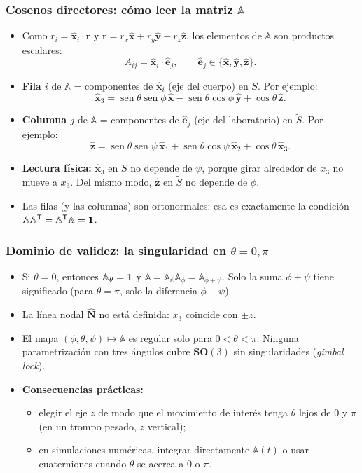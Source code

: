 \documentclass[spanish]{beamer}
\providecommand{\sen}{\operatorname{sen}}       %
\newcommand{\vect}[1]{\mathbf{#1}}              %
\newcommand{\uv}[1]{\hat{\mathbf{#1}}}          %
\newcommand{\Rot}{\mathbb{A}}                   %
\newcommand{\Slab}{S}                           %
\newcommand{\Scue}{\tilde{S}}                   %
\newcommand{\tr}{\mathsf{T}}                    %
\begin{document}
\begin{frame}
  \frametitle{Cosenos directores: cómo leer la matriz $\Rot$}
  \begin{itemize}
    \item<1-> Como $r_i=\uv{x}_i\cdot\vect{r}$ y $\vect{r}=r_x\uv{x}+r_y\uv{y}+r_z\uv{z}$,
          los elementos de $\Rot$ son productos escalares:
          \[
            A_{ij}=\uv{x}_i\cdot\uv{e}_j,\qquad \uv{e}_j\in\{\uv{x},\uv{y},\uv{z}\}.
          \]
    \item<2-> \textbf{Fila $i$} de $\Rot$ = componentes de $\uv{x}_i$ (eje del cuerpo)
          en $\Slab$. Por ejemplo:
          \[ \uv{x}_3=\sen\theta\sen\phi\,\uv{x}-\sen\theta\cos\phi\,\uv{y}+\cos\theta\,\uv{z}. \]
    \item<3-> \textbf{Columna $j$} de $\Rot$ = componentes de $\uv{e}_j$ (eje del
          laboratorio) en $\Scue$. Por ejemplo:
          \[ \uv{z}=\sen\theta\sen\psi\,\uv{x}_1+\sen\theta\cos\psi\,\uv{x}_2+\cos\theta\,\uv{x}_3. \]
    \item<4-> \textbf{Lectura física:} $\uv{x}_3$ en $\Slab$ no depende de $\psi$,
          porque girar alrededor de $x_3$ no mueve a $x_3$. Del mismo modo,
          $\uv{z}$ en $\Scue$ no depende de $\phi$.
    \item<5-> Las filas (y las columnas) son ortonormales: esa es exactamente la
          condición $\Rot\Rot^{\tr}=\Rot^{\tr}\Rot=\Id$.
  \end{itemize}
\end{frame}

\begin{frame}
  \frametitle{Dominio de validez: la singularidad en $\theta=0,\pi$}
  \begin{itemize}
    \item<1-> Si $\theta=0$, entonces $\Rot_\theta=\Id$ y
          $\Rot=\Rot_\psi\Rot_\phi=\Rot_{\phi+\psi}$.
          Solo la suma $\phi+\psi$ tiene significado (para $\theta=\pi$, solo la
          diferencia $\phi-\psi$).
    \item<2-> La línea nodal $\uv{N}$ no está definida: $x_3$ coincide con $\pm z$.
    \item<3-> El mapa $(\phi,\theta,\psi)\mapsto\Rot$ es regular solo para
          $0<\theta<\pi$. Ninguna parametrización con tres ángulos cubre
          $\mathbf{SO}(3)$ sin singularidades (\emph{gimbal lock}).
    \item<4-> \textbf{Consecuencias prácticas:}
      \begin{itemize}
        \item elegir el eje $z$ de modo que el movimiento de interés tenga $\theta$
              lejos de $0$ y $\pi$ (en un trompo pesado, $z$ vertical);
        \item en simulaciones numéricas, integrar directamente $\Rot(t)$ o usar
              cuaterniones cuando $\theta$ se acerca a $0$ o $\pi$.
      \end{itemize}
  \end{itemize}
\end{frame}
\end{document}
